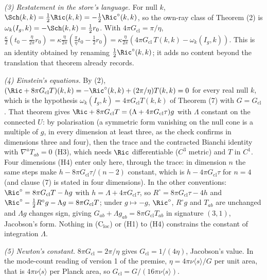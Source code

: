 \emph{(3) Restatement in the store's language.} For null $k$, $\Sch(k,k) = \tfrac12\Ric(k,k) = -\tfrac12\Ric^{\circ}(k,k)$, so the own-ray class of Theorem (2) is $\omega_{k}(I_{g},k) = -\Sch(k,k) = \tfrac12 r_{0}$. With $4\pi G_{\mathrm{cl}} = \pi/\eta$, $\tfrac{\kappa}{2}(t_{0} - \tfrac{\eta}{2\pi}r_{0}) = \kappa\tfrac{\eta}{2\pi}(\tfrac{\pi}{\eta}t_{0} - \tfrac12 r_{0}) = \kappa\tfrac{\eta}{2\pi}(4\pi G_{\mathrm{cl}}\,T(k,k) - \omega_{k}(I_{g},k))$. This is an identity obtained by renaming $\tfrac12\Ric^{\circ}(k,k)$; it adds no content beyond the translation that theorem already records.

\emph{(4) Einstein's equations.} By (2), $(\Ric + 8\pi G_{\mathrm{cl}}T)(k,k) = -\Ric^{\circ}(k,k) + (2\pi/\eta)T(k,k) = 0$ for every real null $k$, which is the hypothesis $\omega_{k}(I_{g},k) = 4\pi G_{\mathrm{cl}}T(k,k)$ of Theorem (7) with $G = G_{\mathrm{cl}}$. That theorem gives $\Ric + 8\pi G_{\mathrm{cl}}T = (\Lambda + 4\pi G_{\mathrm{cl}}\tau)g$ with $\Lambda$ constant on the connected $U$: by polarisation (a symmetric form vanishing on the null cone is a multiple of $g$, in every dimension at least three, as the check confirms in dimensions three and four), then the trace and the contracted Bianchi identity with $\nabla^{a}T_{ab} = 0$ (H3), which needs $\Ric$ differentiable ($C^{3}$ metric) and $T$ in $C^{1}$. Four dimensions (H4) enter only here, through the trace: in dimension $n$ the same steps make $h - 8\pi G_{\mathrm{cl}}\tau/(n-2)$ constant, which is $h - 4\pi G_{\mathrm{cl}}\tau$ for $n = 4$ (and clause (7) is stated in four dimensions). In the other conventions: $\Ric^{\circ} = 8\pi G_{\mathrm{cl}}T - h g$ with $h = \Lambda + 4\pi G_{\mathrm{cl}}\tau$, so $R^{\circ} = 8\pi G_{\mathrm{cl}}\tau - 4h$ and $\Ric^{\circ} - \tfrac12R^{\circ}g - \Lambda g = 8\pi G_{\mathrm{cl}}T$; under $g \mapsto -g$, $\Ric^{\circ}$, $R^{\circ}g$ and $T_{ab}$ are unchanged and $\Lambda g$ changes sign, giving $G_{ab} + \Lambda g_{ab} = 8\pi G_{\mathrm{cl}}T_{ab}$ in signature $(3,1)$, Jacobson's form. Nothing in (C$_{\mathrm{loc}}$) or (H1) to (H4) constrains the constant of integration $\Lambda$.

\emph{(5) Newton's constant.} $8\pi G_{\mathrm{cl}} = 2\pi/\eta$ gives $G_{\mathrm{cl}} = 1/(4\eta)$, Jacobson's value. In the mode-count reading of version 1 of the premise, $\eta = 4\pi\nu\langle s\rangle/G$ per unit area, that is $4\pi\nu\langle s\rangle$ per Planck area, so $G_{\mathrm{cl}} = G/(16\pi\nu\langle s\rangle)$.

